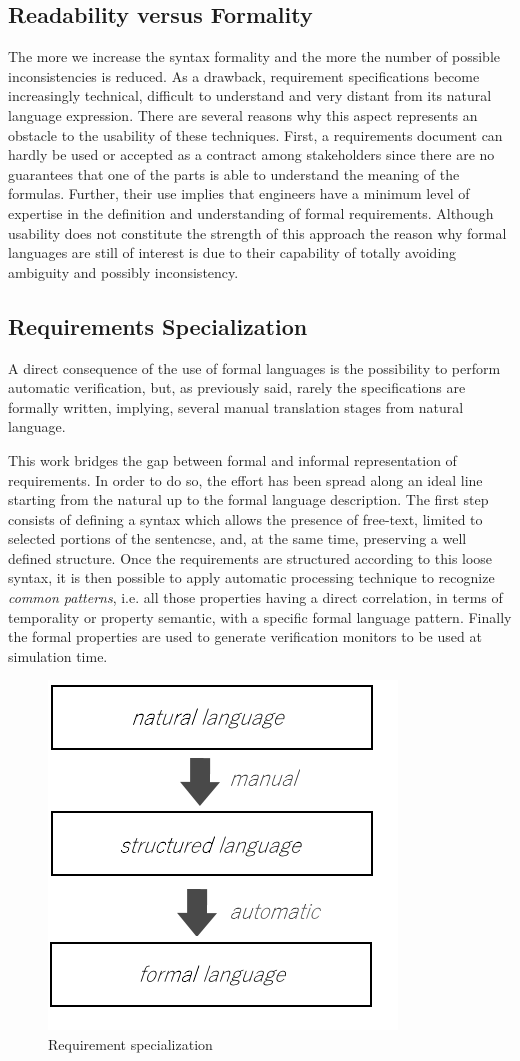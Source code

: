 \subsection{Readability versus Formality}
The more we increase the syntax formality and the more the number of possible inconsistencies is reduced. As a drawback, requirement specifications become increasingly technical, difficult to understand and very distant from its natural language expression. There are several reasons why this aspect represents an obstacle to the usability of these techniques. First, a requirements document can hardly be used or accepted as a contract among stakeholders since there are no guarantees that one of the parts is able to understand the meaning of the formulas. Further, their use implies that engineers have a minimum level of expertise in the definition and understanding of formal requirements. Although usability does not constitute the strength of this approach the reason why formal languages are still of interest is due to their capability of totally avoiding ambiguity and possibly inconsistency.

\subsection{Requirements Specialization}
A direct consequence of the use of formal languages is the possibility to perform automatic verification, but, as previously said, rarely the specifications are formally written, implying, several manual translation stages from natural language. 
\par This work bridges the gap between formal and informal representation of requirements. In order to do so, the effort has been spread along an ideal line starting from the natural up to the formal language description. The first step consists of defining a syntax which allows the presence of free-text, limited to selected portions of the sentencse, and, at the same time, preserving a well defined structure. Once the requirements are structured according to this loose syntax, it is then possible to apply automatic processing technique to recognize \textit{common patterns}, i.e. all those properties having a direct correlation, in terms of temporality or property semantic, with a specific formal language pattern. Finally the formal properties are used to generate verification monitors to be used at simulation time.

\begin{figure}[!h]
	\centering 
     \includegraphics[width=.4\textwidth]{Figs/specialization.png} 
     \caption{Requirement specialization} 
     \label{fig:reqspec} 
\end{figure} 
 

